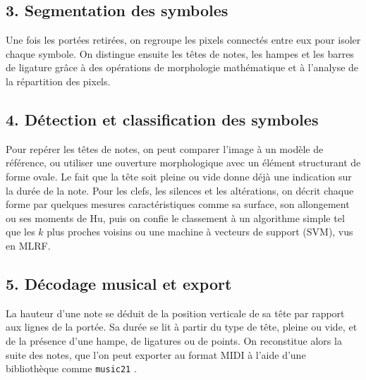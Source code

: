 \documentclass[11pt,a4paper]{article}
\begin{document}
\subsection{3. Segmentation des symboles}
Une fois les portées retirées, on regroupe les pixels connectés entre eux pour isoler chaque symbole.
On distingue ensuite les têtes de notes, les hampes et les barres de ligature grâce à des opérations de
morphologie mathématique et à l'analyse de la répartition des pixels.

\subsection{4. Détection et classification des symboles}
Pour repérer les têtes de notes, on peut comparer l'image à un modèle de référence, ou utiliser une
ouverture morphologique avec un élément structurant de forme ovale. Le fait que la tête soit pleine ou
vide donne déjà une indication sur la durée de la note. Pour les clefs, les silences et les altérations,
on décrit chaque forme par quelques mesures caractéristiques comme sa surface, son allongement ou ses
moments de Hu, puis on confie le classement à un algorithme simple tel que les $k$ plus proches voisins
ou une machine à vecteurs de support (SVM), vus en MLRF.

\subsection{5. Décodage musical et export}
La hauteur d'une note se déduit de la position verticale de sa tête par rapport aux lignes de la portée.
Sa durée se lit à partir du type de tête, pleine ou vide, et de la présence d'une hampe, de ligatures ou
de points. On reconstitue alors la suite des notes, que l'on peut exporter au format MIDI à l'aide d'une
bibliothèque comme \texttt{music21} \cite{cuthbert2010}.
\newpage
\printbibliography[heading=bibnumbered,title={Références}]
\end{document}
